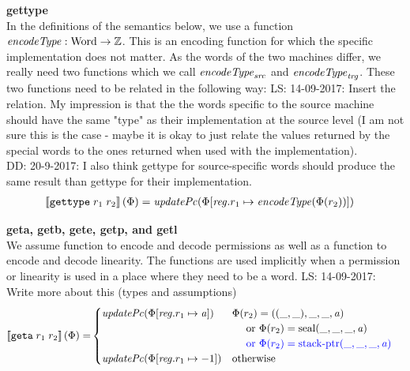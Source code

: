 \documentclass[a3paper]{article}
\newcommand\lau[1]{{\color{purple} \sf \footnotesize {LS: #1}}\\}
\newcommand\dominique[1]{{\color{purple} \sf \footnotesize {DD: #1}}\\}
\newcommand{\sem}[1]{\left\llbracket #1 \right\rrbracket}
\newcommand{\tor}{\text{ or }}
\newcommand{\totherwise}{\text{otherwise }}
\newcommand{\sourcecolor}{\color{blue}}
\newcommand{\src}[1]{{\sourcecolor #1}}
\newcommand{\targetcolor}[1]{\color{black}}
\newcommand{\trg}[1]{{\targetcolor{} #1}}
\newcommand{\zinstr}[1]{\texttt{#1}}
\newcommand{\twoinstr}[3]{
  \ifthenelse{\equal{#2#3}{}}
  {\zinstr{#1}}
  {\zinstr{#1} \; #2 \; #3}
}
\newcommand{\tisptr}[2]{\twoinstr{\trg{gettype}}{#1}{#2}}
\newcommand{\tgeta}[2]{\twoinstr{\trg{geta}}{#1}{#2}}
\newcommand{\ints}{\mathbb{Z}}
\newcommand{\update}[2]{[#1 \mapsto #2]}
\newcommand{\updReg}[2]{\update{\reg.#1}{#2}}
\newcommand{\shareddom}[1]{\mathrm{#1}}
\newcommand{\Word}{\shareddom{Word}}
\newcommand{\stkptr}[1]{\mathrm{stack\text{-}ptr}(#1)}
\newcommand{\seal}[1]{\shareddom{seal}(#1)}
\newcommand{\var}[1]{\mathit{#1}}
\newcommand{\reg}{\var{reg}}
\newcommand{\aaddr}{\var{a}}
\newcommand{\plainfun}[2]{
  \ifthenelse{\equal{#2}{}}
  {\mathit{#1}}
  {\mathit{#1}(#2)}
}
\newcommand{\encType}[1]{\plainfun{encodeType}{#1}}
\newcommand{\updPcAddr}[1]{\plainfun{updatePc}{#1}}
\begin{document}
\noindent\textbf{gettype}\\
In the definitions of the semantics below, we use a function $\encType{} : \Word \rightarrow \ints$. This is an encoding function for which the specific implementation does not matter. As the words of the two machines differ, we really need two functions which we call $\encType{}_{\var{src}}$ and $\encType{}_{\var{trg}}$. These two functions need to be related in the following way:
\lau{14-09-2017: Insert the relation. My impression is that the the words specific to the source machine should have the same "type" as their implementation at the source level (I am not sure this is the case - maybe it is okay to just relate the values returned by the special words to the ones returned when used with the implementation). }
\dominique{20-9-2017: I also think gettype for source-specific words should produce the same result than gettype for their implementation.}
\begin{align*}
  \sem{\tisptr{r_1}{r_2}}(\Phi) = & \; \updPcAddr{}(\Phi\updReg{r_1}{\encType{\Phi(r_2)}})
\end{align*}


\noindent\textbf{geta, getb, gete, getp, and getl}\\
We assume function to encode and decode permissions as well as a function to encode and decode linearity. The functions are used implicitly when a permission or linearity is used in a place where they need to be a word.
\lau{14-09-2017: Write more about this (types and assumptions)}
\begin{align*}
  \sem{\tgeta{r_1}{r_2}}(\Phi) = & 
                                   \begin{cases}
                                     \updPcAddr{\Phi\updReg{r_1}{\aaddr}} & 
                                     \arraycolsep=0pt
                                     \begin{array}[t]{l}
                                       \Phi(r_2) = ((\_,\_),\_,\_,\aaddr) \\
                                       \quad \tor \Phi(r_2) = \seal{\_,\_,\_,\aaddr} \\
                                       \quad \src{\tor \Phi(r_2) = \stkptr{\_,\_,\_,\aaddr} } \\
                                     \end{array} \\
                                     \updPcAddr{\Phi\updReg{r_1}{-1}} & \totherwise
                                   \end{cases}
\end{align*}
\end{document}
